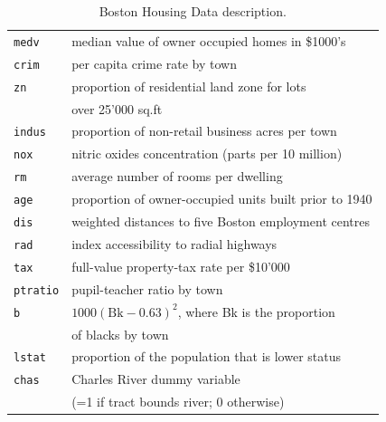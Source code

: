 \documentclass{beamer}
\begin{document}
\begin{frame}

\begin{table}[htbp]
  \begin{center}
{\small \begin{tabular}{ll}
\hline
\texttt{medv} & median value of owner occupied homes in \$1000's\\
\texttt{crim} & per capita crime rate by town\\
\texttt{zn} & proportion of residential land zone for lots \\
 & over 25'000 sq.ft\\
\texttt{indus} & proportion of non-retail business acres per town\\
\texttt{nox} & nitric oxides concentration (parts per 10 million)\\
\texttt{rm} & average number of rooms per dwelling\\
\texttt{age} & proportion of owner-occupied units built prior to 1940\\
\texttt{dis} & weighted distances to five Boston employment centres\\
\texttt{rad} & index accessibility to radial highways\\
\texttt{tax} & full-value property-tax rate per \$10'000\\
\texttt{ptratio} & pupil-teacher ratio by town\\
\texttt{b} & $1000(\mbox{Bk}-0.63)^2$, where Bk is the proportion \\
 & of blacks by town\\
\texttt{lstat} & proportion of the population that is lower status\\
\texttt{chas} & Charles River dummy variable \\
& (=1 if tract bounds river; 0 otherwise)\\
\hline
\end{tabular}}
  \end{center}
\caption{Boston Housing Data description.}
\label{housing.table}
\end{table}
\end{frame}
\end{document}

